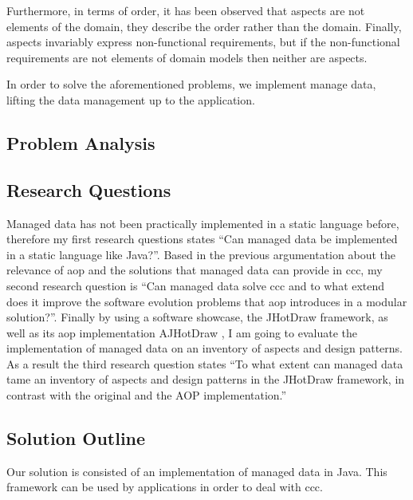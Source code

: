 Furthermore, in terms of order, it has been observed that aspects are not elements of the domain, they describe the order rather than the domain. 
Finally, aspects invariably express non-functional requirements, but if the non-functional requirements are not elements of domain models then neither are aspects.

In order to solve the aforementioned problems, we implement manage data, lifting the data management up to the application.

\subsection{Problem Analysis}\label{Problem Analysis}

\subsection{Research Questions}\label{Research Questions}
Managed data has not been practically implemented in a static language before, therefore my first research questions states 
``Can managed data be implemented in a static language like Java?''. 
Based in the previous argumentation about the relevance of \ac{aop} and the solutions that managed data can provide in \ac{ccc}, my second research question is ``Can managed data solve \ac{ccc} and to what extend does it improve the software evolution problems that \ac{aop} introduces in a modular solution?''. 
Finally by using a software showcase, the JHotDraw framework, as well as its \ac{aop} implementation AJHotDraw \cite{marinajhotdraw}, 
I am going to evaluate the implementation of managed data on an inventory of aspects and design patterns. 
As a result the third research question states ``To what extent can managed data tame an inventory of aspects and design patterns in the JHotDraw framework, in contrast with the original and the AOP implementation.''

\subsection{Solution Outline}\label{Solution Outline}
Our solution is consisted of an implementation of managed data in Java. 
This framework can be used by applications in order to deal with \ac{ccc}.

